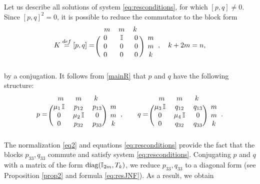 \documentclass{article}
\theoremstyle{plain}
\begin{document}
Let us describe all solutions of system  \eqref{eq:resconditions}, for which  $[p,q]\ne 0$. Since $[p,q]^2 = 0$, it is possible to reduce the commutator to the block form  
\begin{gather} \label{eq2}
    K \stackrel{def}{=} [p, q]
    =
    \begin{blockarray}{cccc}
      \,\,\, m & m & k \,\,\, &  \\
    \begin{block}{(ccc)c}
      0 & \mathbb{I} & 0 & m  \\
      0 & 0 & 0 & m  \\
      0 & 0 & 0 & k  \\
    \end{block}
    \end{blockarray},
    \quad 
    k + 2 m = n,
\end{gather}
by a conjugation.
It follows from \eqref{mainR} that $p$ and $q$ have the following structure:
\begin{gather*}
    p
    =
    \begin{blockarray}{cccc}
      \,\,\, m & m & k \,\,\, &  \\
    \begin{block}{(ccc)c}
      \mu_1 \, \mathbb{I} & p_{12} & p_{13} & m  \\
      0 & \mu_2 \, \mathbb{I} & 0 & m  \\
      0 & p_{32} & p_{33} & k  \\
    \end{block}
    \end{blockarray},
    \qquad
    q
    =
    \begin{blockarray}{cccc}
      \,\,\, m & m & k \,\,\, &  \\
    \begin{block}{(ccc)c}
      \mu_3 \, \mathbb{I} & q_{12} & q_{13} & m  \\
      0 & \mu_4 \, \mathbb{I} & 0 & m  \\
      0 & q_{32} & q_{33} & k  \\
    \end{block}
    \end{blockarray}.
\end{gather*}
The normalization \eqref{eq2} and equations \eqref{eq:resconditions} provide the fact that the blocks $p_{33}, q_{33}$ commute and satisfy system \eqref{eq:resconditions}. Conjugating $p$ and $q$ with a matrix of the form ${\rm diag}(\mathbb{I}_{2m}, T_k)$, we reduce $p_{33}, q_{33}$ to a diagonal form (see Proposition \ref{prop2} and formula \eqref{eq:resJNF}). As a result, we obtain
\end{document}
